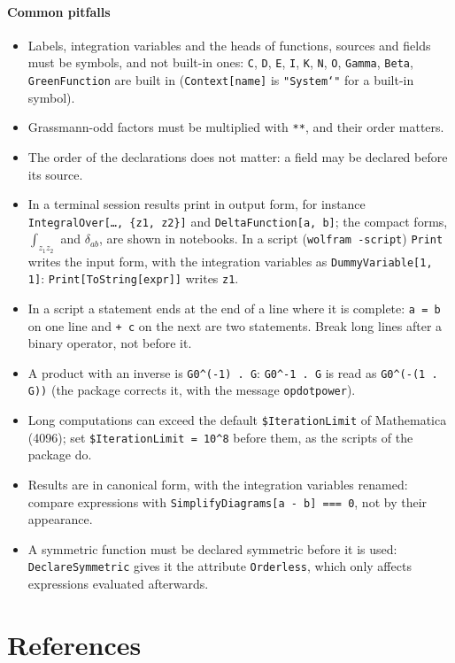 \documentclass[11pt,a4paper]{article}
\newcommand{\pkg}[1]{\texttt{#1}}
\begin{document}
\paragraph{Common pitfalls}
\begin{itemize}
\item Labels, integration variables and the heads of functions, sources and fields must be symbols, and not built-in
  ones: \pkg{C}, \pkg{D}, \pkg{E}, \pkg{I}, \pkg{K}, \pkg{N}, \pkg{O}, \pkg{Gamma}, \pkg{Beta}, \pkg{GreenFunction} are built in
  (\pkg{Context[name]} is \pkg{"System`"} for a built-in symbol).
\item Grassmann-odd factors must be multiplied with \pkg{**}, and their order matters.
\item The order of the declarations does not matter: a field may be declared before its source.
\item In a terminal session results print in output form, for instance \pkg{IntegralOver[\dots, \{z1, z2\}]} and
  \pkg{DeltaFunction[a, b]}; the compact forms, $\int_{z_1z_2}$ and $\delta_{ab}$, are shown in notebooks. In a script
  (\pkg{wolfram -script}) \pkg{Print} writes the input form, with the integration variables as \pkg{DummyVariable[1, 1]}:
  \pkg{Print[ToString[expr]]} writes \pkg{z1}.
\item In a script a statement ends at the end of a line where it is complete: \pkg{a = b} on one line and
  \pkg{+ c} on the next are two statements. Break long lines after a binary operator, not before it.
\item A product with an inverse is \pkg{G0\^{}(-1) . G}: \pkg{G0\^{}-1 . G} is read as \pkg{G0\^{}(-(1 . G))} (the package
  corrects it, with the message \pkg{opdotpower}).
\item Long computations can exceed the default \pkg{\$IterationLimit} of Mathematica (4096); set
  \pkg{\$IterationLimit = 10\^{}8} before them, as the scripts of the package do.
\item Results are in canonical form, with the integration variables renamed: compare expressions with
  \pkg{SimplifyDiagrams[a - b] === 0}, not by their appearance.
\item A symmetric function must be declared symmetric before it is used: \pkg{DeclareSymmetric} gives it the attribute
  \pkg{Orderless}, which only affects expressions evaluated afterwards.
\end{itemize}

\section*{References}\label{sec:references}
\end{document}
